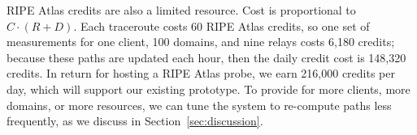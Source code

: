 RIPE Atlas credits are also a limited resource.  Cost is proportional to
$C \cdot (R+D)$.
Each traceroute costs 60 RIPE Atlas credits, so one set of measurements
for one client, 100 domains, and nine relays costs 6,180 
credits; because these paths are updated each hour, then 
the daily credit cost is 148,320 credits.  In return for hosting a RIPE Atlas 
probe, we earn 216,000 credits per day, which will support our existing 
prototype.  To provide for more clients, more domains, or more 
resources, we can tune the system to re-compute paths less frequently,
as we discuss in Section~\ref{sec:discussion}.
